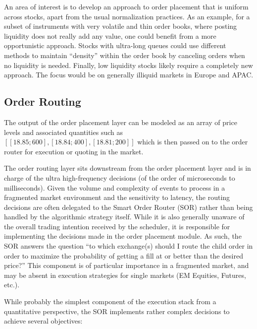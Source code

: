 An area of interest is to develop an approach to order placement that is uniform across stocks, apart from the usual normalization practices. As an example, for a subset of instruments with very volatile and thin order books, where posting liquidity does not really add any value, one could benefit from a more opportunistic approach. Stocks with ultra-long queues could use different methods to maintain ``density'' within the order book by canceling orders when no liquidity is needed. Finally, low liquidity stocks likely require a completely new approach. The focus would be on generally illiquid markets in Europe and APAC.


\subsection{Order Routing\label{sec:order_routing}}

The output of the order placement layer can be modeled as an array of price levels and associated quantities such as $[ [18.85 ; 600], [18.84 ; 400], [18.81 ; 200] ]$ which is then passed on to the order router for execution or quoting in the market.


The order routing layer sits downstream from the order placement layer and is in charge of the ultra high-frequency decisions (of the order of microseconds to milliseconds). Given the volume and complexity of events to process in a fragmented market environment and the sensitivity to latency, the routing decisions are often delegated to the Smart Order Router (SOR)\label{in:sor1} rather than being handled by the algorithmic strategy itself. While it is also generally unaware of the overall trading intention received by the scheduler, it is responsible for implementing the decisions made in the order placement module. As such, the SOR answers the question ``to which exchange(s) should I route the child order in order to maximize the probability of getting a fill at or better than the desired price?'' This component is of particular importance in a fragmented market, and may be absent in execution strategies for single markets (EM Equities, Futures, etc.). 


While probably the simplest component of the execution stack from a quantitative perspective, the SOR implements rather complex decisions to achieve several objectives: 


